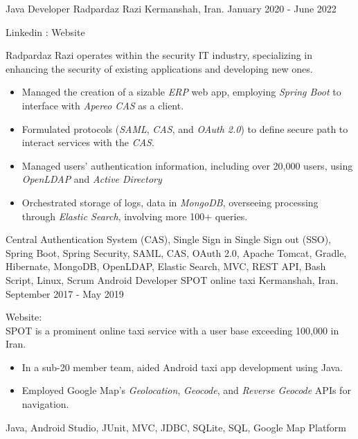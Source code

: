 \begin{experiences}
\experience
{}
{Java Developer}
{Radpardaz Razi}
{Kermanshah, Iran. \hspace{170 pt} January 2020 - June 2022}
{}
{
Linkedin : 
Website 
\par{Radpardaz Razi operates within the security IT industry, specializing in enhancing the security of existing applications and developing new ones.}
\begin{itemize}
\item Managed the creation of a sizable \emph{ERP} web app, employing \emph{Spring Boot} to interface with \emph{Apereo CAS} as a client.
\item Formulated protocols (\emph{SAML}, \emph{CAS}, and \emph{OAuth 2.0}) to define secure path to interact services with the \textit{CAS}.
\item Managed users' authentication information, including over 20,000 users, using \emph{OpenLDAP} and \emph{Active Directory}
\item Orchestrated storage of logs, data in \emph{MongoDB}, overseeing processing through \emph{Elastic Search}, involving more 100+ queries.
\end{itemize}
}
{Central Authentication System (CAS), Single Sign in Single Sign out (SSO), Spring Boot, Spring Security, SAML, CAS, OAuth 2.0, Apache Tomcat, Gradle, Hibernate, MongoDB, OpenLDAP, Elastic Search, MVC, REST API, Bash Script, Linux, Scrum}
\emptySeparator
\experience
  {}
  {Android Developer }
  {SPOT online taxi}
  {Kermanshah, Iran. \hspace{140 pt} September 2017 - May 2019}
  {}
  {
  Website: \\
  SPOT is a prominent online taxi service with a user base exceeding 100,000 in Iran. 
  \begin{itemize}
    \item In a sub-20 member team, aided Android taxi app development using Java.
    \item Employed Google Map's \emph{Geolocation}, \emph{Geocode}, and \emph{Reverse Geocode} APIs for navigation.\end{itemize}
  }
  {Java, Android Studio, JUnit, MVC, JDBC, SQLite, SQL, Google Map Platform}

\emptySeparator


\end{experiences}
